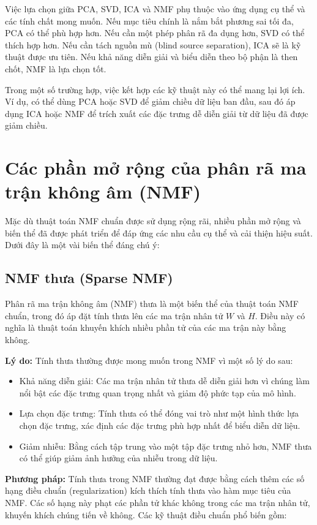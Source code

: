 Việc lựa chọn giữa PCA, SVD, ICA và NMF phụ thuộc vào ứng dụng cụ thể và các tính chất mong muốn. Nếu mục tiêu chính là nắm bắt phương sai tối đa, PCA có thể phù hợp hơn. Nếu cần một phép phân rã đa dụng hơn, SVD có thể thích hợp hơn. Nếu cần tách nguồn mù (blind source separation), ICA sẽ là kỹ thuật được ưu tiên. Nếu khả năng diễn giải và biểu diễn theo bộ phận là then chốt, NMF là lựa chọn tốt.

Trong một số trường hợp, việc kết hợp các kỹ thuật này có thể mang lại lợi ích. Ví dụ, có thể dùng PCA hoặc SVD để giảm chiều dữ liệu ban đầu, sau đó áp dụng ICA hoặc NMF để trích xuất các đặc trưng dễ diễn giải từ dữ liệu đã được giảm chiều.

\section{Các phần mở rộng của phân rã ma trận không âm (NMF)}

Mặc dù thuật toán NMF chuẩn được sử dụng rộng rãi, nhiều phần mở rộng và biến thể đã được phát triển để đáp ứng các nhu cầu cụ thể và cải thiện hiệu suất. Dưới đây là một vài biến thể đáng chú ý:

\subsection{NMF thưa (Sparse NMF)}

Phân rã ma trận không âm (NMF) thưa là một biến thể của thuật toán NMF chuẩn, trong đó áp đặt tính thưa lên các ma trận nhân tử \(W\) và \(H\). Điều này có nghĩa là thuật toán khuyến khích nhiều phần tử của các ma trận này bằng không.

\textbf{Lý do:} Tính thưa thường được mong muốn trong NMF vì một số lý do sau:

\begin{itemize}
\item
  Khả năng diễn giải: Các ma trận nhân tử thưa dễ diễn giải hơn vì chúng làm nổi bật các đặc trưng quan trọng nhất và giảm độ phức tạp của mô hình.
\item
  Lựa chọn đặc trưng: Tính thưa có thể đóng vai trò như một hình thức lựa chọn đặc trưng, xác định các đặc trưng phù hợp nhất để biểu diễn dữ liệu.
\item
  Giảm nhiễu: Bằng cách tập trung vào một tập đặc trưng nhỏ hơn, NMF thưa có thể giúp giảm ảnh hưởng của nhiễu trong dữ liệu.
\end{itemize}

\textbf{Phương pháp:} Tính thưa trong NMF thường đạt được bằng cách thêm các số hạng điều chuẩn (regularization) kích thích tính thưa vào hàm mục tiêu của NMF. Các số hạng này phạt các phần tử khác không trong các ma trận nhân tử, khuyến khích chúng tiến về không. Các kỹ thuật điều chuẩn phổ biến gồm:

